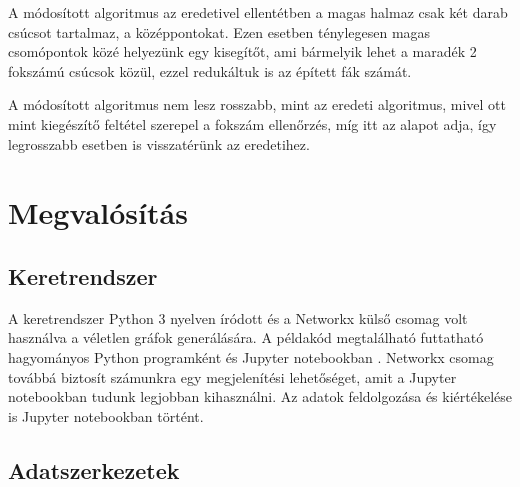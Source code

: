 \documentclass[12pt]{report}
\begin{document}
A módosított algoritmus az eredetivel ellentétben a magas halmaz csak két darab csúcsot tartalmaz, a középpontokat.
Ezen esetben ténylegesen magas csomópontok közé helyezünk egy kisegítőt, ami bármelyik lehet a maradék 2 fokszámú csúcsok közül, ezzel redukáltuk is az épített fák számát.

A módosított algoritmus nem lesz rosszabb, mint az eredeti algoritmus, mivel ott mint kiegészítő feltétel szerepel a fokszám ellenőrzés, míg itt az alapot adja, így legrosszabb esetben is visszatérünk az eredetihez. 

\chapter{Megvalósítás}


\section{Keretrendszer}

A keretrendszer Python 3 \cite{noauthor_python_nodate} nyelven íródott és a Networkx \cite{noauthor_networkx_nodate} külső csomag volt használva a véletlen gráfok generálására.
A példakód megtalálható futtatható hagyományos Python programként és Jupyter notebookban \cite{noauthor_jupyter_nodate}.  
Networkx csomag továbbá biztosít számunkra egy megjelenítési lehetőséget, amit a Jupyter notebookban tudunk legjobban kihasználni.
Az adatok feldolgozása és kiértékelése is Jupyter notebookban történt. 

\section{Adatszerkezetek}
\end{document}
